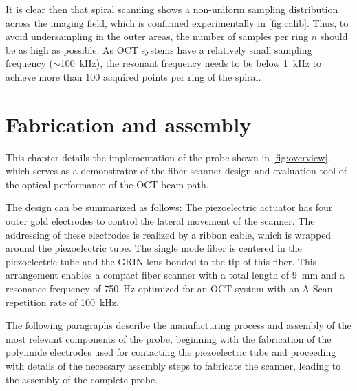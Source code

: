 \documentclass[10pt]{iopart}
\begin{document}
It is clear then that spiral scanning shows a non-uniform sampling distribution across the imaging field, which is confirmed experimentally in \autoref{fig:calib}. Thus, to avoid undersampling in the outer areas, the number of samples per ring $n$ should be as high as possible. As OCT systems have a relatively small sampling frequency ($\sim$\SI{100}{\kilo\hertz}), the resonant frequency needs to be below \SI{1}{kHz} to achieve more than 100 acquired points per ring of the spiral.



\section{Fabrication and assembly}


This chapter details the implementation of the probe shown in \autoref{fig:overview}, which serves as a demonstrator of the fiber scanner design and evaluation tool of the optical performance of the OCT beam path.

The design can be summarized as follows: The piezoelectric actuator has four outer gold electrodes to control the lateral movement of the scanner. The addressing of these electrodes is realized by a ribbon cable, which is wrapped around the piezoelectric tube. The single mode fiber is centered in the piezoelectric tube and the GRIN lens bonded to the tip of this fiber. This arrangement enables a compact fiber scanner with a total length of \SI{9}{\milli\meter} and a resonance frequency of \SI{750}{\hertz} optimized for an OCT system with an A-Scan repetition rate of \SI{100}{\kilo\hertz}.

The following paragraphs describe the manufacturing process and assembly of the most relevant components of the probe, beginning with the fabrication of the polyimide electrodes used for contacting the piezoelectric tube and proceeding with details of the necessary assembly steps to fabricate the scanner, leading to the assembly of the complete probe.
\end{document}
